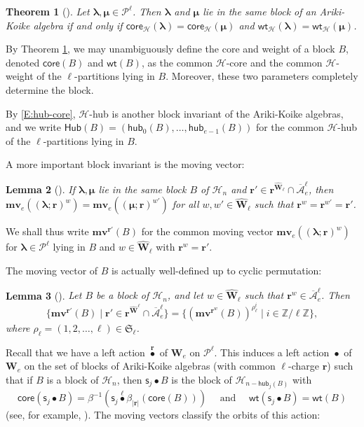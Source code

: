 \documentclass[11pt,a4paper,reqno]{amsart}
\numberwithin{equation}{section}
\theoremstyle{plain}
\newtheorem{thm}{Theorem}[section]
\newtheorem{lem}[thm]{Lemma}
\theoremstyle{definition}
\theoremstyle{remark}
\numberwithin{equation}{section}
\newcommand{\bl}{\boldsymbol{\lambda}}
\newcommand{\bm}{\boldsymbol{\mu}}
\newcommand{\br}{\mathbf{r}}
\newcommand{\wt}{\mathsf{wt}}
\newcommand{\core}{\mathsf{core}}
\newcommand{\mv}{\mathbf{mv}}
\newcommand{\ZZ}{\mathbb{Z}}
\newcommand{\cs}{\mathsf{s}}
\newcommand{\HH}{\mathcal{H}}
\newcommand{\rr}{\rho}
\newcommand{\Hub}{\mathsf{Hub}}
\newcommand{\hub}{\mathsf{hub}}
\newcommand{\PP}{\mathcal{P}}
\newcommand{\EW}{\widehat{\mathbf{W}}}
\newcommand{\AW}{\mathbf{W}}
\newcommand{\sym}[1]{\mathfrak{S}_{#1}}
\newcommand{\DDot}[1]{\mathrel{\overset{#1}{\bullet}}}
\newcommand{\AAbar}{\overline{\mathcal{A}}_e^{\ell}}
\begin{document}
\begin{thm}[{\cite[Corollary 4.5]{LT}}] \label{T:Naka}
Let $\bl,\bm \in \PP^{\ell}$.  Then $\bl$ and $\bm$ lie in the same block of an Ariki-Koike algebra if and only if $\core_{\HH}(\bl) = \core_{\HH}(\bm)$ and $\wt_{\HH}(\bl) = \wt_{\HH}(\bm)$.
\end{thm}

By Theorem \ref{T:Naka},
we may unambiguously define the core and weight of a block $B$, denoted $\core(B)$ and $\wt(B)$, as the common $\HH$-core and the common $\HH$-weight of the $\ell$-partitions lying in $B$. Moreover, these two parameters completely determine the block.

By \eqref{E:hub-core}, $\HH$-hub is another block invariant of the Ariki-Koike algebras, and we write $\Hub(B) = (\hub_0(B),\dotsc,\hub_{e-1}(B))$ for the common $\HH$-hub of the $\ell$-partitions lying in $B$.

A more important block invariant is the moving vector:

\begin{lem}[{\cite[Lemma 3.10(2)]{LQT}}] \label{L:mv-block invariant}
If $\bl, \bm$ lie in the same block $B$ of $\HH_n$ and $\br' \in \br^{\EW_{\ell}} \cap \AAbar$, then $\mv_e((\bl;\br)^{w}) = \mv_e((\bm;\br)^{w'})$ for all $w,w'\in \EW_{\ell}$ such that $\br^w =\br^{w'} = \br'$.
\end{lem}

We shall thus write $\mv^{\br'}(B)$ for the common moving vector $\mv_e((\bl;\br)^w)$ for $\bl \in \PP^{\ell}$ lying in $B$ and $w \in \EW_{\ell}$ with $\br^w = \br'$.

The moving vector of $B$ is actually well-defined up to cyclic permutation:

\begin{lem}[{\cite[Corollary 3.12]{LQT}}] \label{L:mv-cyclic permutation}
Let $B$ be a block of $\HH_n$, and let $w \in \EW_{\ell}$ such that $\br^{w} \in \AAbar$.  Then 
$$
\{ \mv^{\br'}(B) \mid \br' \in \br^{\EW^{\ell}} \cap \AAbar \} = \{ (\mv^{\br^{w}}(B))^{\rr_{\ell}^i} \mid i \in \ZZ/\ell\ZZ \},
$$
where $\rr_{\ell} = (1,2,\dotsc, \ell) \in \sym{\ell}$.
\end{lem}



Recall that we have a left action $\DDot{\br}$ of $\AW_e$ on $\PP^{\ell}$.
This induces a left action $\DDot{}$ of $\AW_e$ on the set of blocks of Ariki-Koike algebras (with common $\ell$-charge $\br$) such that if $B$ is a block of $\HH_n$, then $\cs_j \DDot{} B$ is the block of $\HH_{n-\hub_j(B)}$ with
$$
\core(\cs_j \DDot{} B ) = \beta^{-1}(\cs_j \DDot{\ell} \beta_{|\br|}(\core(B))) \quad \text{ and } \quad \wt(\cs_j \DDot{} B) = \wt(B)
$$
(see, for example, \cite[Proposition 4.8]{LT}).
The moving vectors classify the orbits of this action:
\end{document}
